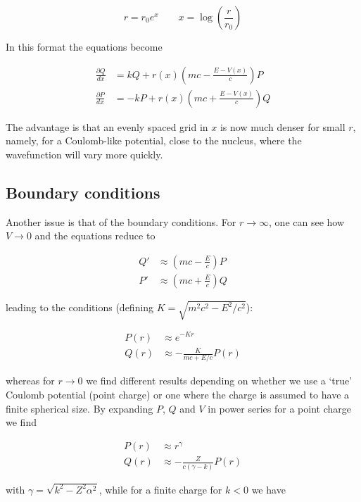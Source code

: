 \documentclass[]{report}
\begin{document}
\begin{equation}
r = r_0e^x \qquad x = \log\left(\frac{r}{r_0}\right)
\end{equation}

In this format the equations become

\begin{align}\label{dirac_sys_log}
\frac{\partial Q}{dx} &= kQ + r(x)\left(mc-\frac{E-V(x)}{c}\right)P \\
\frac{\partial P}{dx} &= -kP + r(x)\left(mc+\frac{E-V(x)}{c}\right)Q
\end{align}

The advantage is that an evenly spaced grid in $x$ is now much denser for small $r$, namely, for a Coulomb-like potential, close to the nucleus, where the wavefunction will vary more quickly.

\subsection{Boundary conditions}
Another issue is that of the boundary conditions. For $r \rightarrow \infty$, one can see how $V \rightarrow 0$ and the equations reduce to \cite{silbar2010}

\begin{align}\label{dirac_sys_inf}
Q' &\approx \left(mc-\frac{E}{c}\right)P \\
P' &\approx \left(mc+\frac{E}{c}\right)Q
\end{align}

leading to the conditions (defining $K = \sqrt{m^2c^2-E^2/c^2}$):

\begin{align}
P(r) &\approx e^{-Kr} \\
Q(r) &\approx -\frac{K}{mc+E/c}P(r)
\end{align}

whereas for $r \rightarrow 0$ we find different results depending on whether we use a `true' Coulomb potential (point charge) or one where the charge is assumed to have a finite spherical size. By expanding $P$, $Q$ and $V$ in power series for a point charge we find \cite{grant2009}

\begin{align}
P(r) &\approx r^{\gamma} \\
Q(r) &\approx -\frac{Z}{c(\gamma-k)}P(r)
\end{align}

with $\gamma = \sqrt{k^2-Z^2\alpha^2}$, while for a finite charge for $k < 0$ we have
\end{document}
